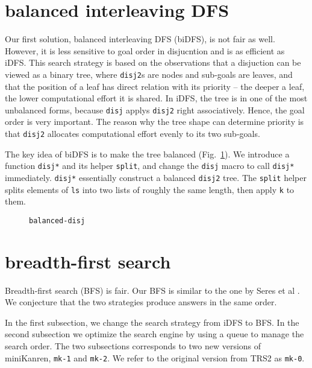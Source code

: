 \documentclass[format=acmlarge, review=true, authordraft=true]{acmart}
\begin{document}
\section{balanced interleaving DFS}

Our first solution, balanced interleaving DFS (biDFS), is not fair as well. 
However, it is less sensitive to goal order in disjucntion and is as efficient 
as iDFS. This search strategy is based on the  observations that a disjuction 
can be viewed as a binary tree, where \texttt{disj2}s are nodes 
and sub-goals are leaves, and that the position of a leaf has direct relation 
with its priority -- the deeper a leaf, the lower computational effort it is 
shared. In iDFS, the tree is in one of the most unbalanced forms, because 
\texttt{disj} applys \texttt{disj2} right associatively. Hence, the goal order 
is very important. The reason why the tree shape can determine priority is that 
\texttt{disj2} allocates computational effort evenly to its two sub-goals.

The key idea of biDFS is to make the tree balanced (Fig.~\ref{balanced-disj}). 
We introduce a function \texttt{disj*} and its helper \texttt{split}, and change 
the \texttt{disj} macro to call \texttt{disj*} immediately. \texttt{disj*} 
essentially construct a balanced \texttt{disj2} tree. The \texttt{split} helper 
splits elements of \texttt{ls} into two lists of roughly the same length, then 
apply \texttt{k} to them.

\begin{figure}
  
  \caption{\texttt{balanced-disj}}
  \label{balanced-disj}
\end{figure}

\section{breadth-first search}


Breadth-first search (BFS) is fair. Our BFS is similar to the one by Seres et 
al \citet{seres1999algebra}. We conjecture that the two strategies produce
answers in the same order.

In the first subsection, we change the search strategy from iDFS to BFS. In the 
second subsection we optimize the search engine by using a queue to manage the 
search order. The two subsections corresponds to two new versions of miniKanren, 
\texttt{mk-1} and \texttt{mk-2}. We refer to the original version from TRS2 as 
\texttt{mk-0}. 
\end{document}
